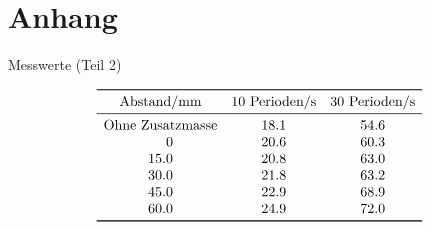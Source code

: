 \documentclass[11pt,a4paper]{article}
\begin{document}

\pagebreak


\section{Anhang}

\begin{table}[h]
\caption{Messwerte (Teil 2)}
$$
\begin{array}{ccc}	
	\toprule 
	\textrm{Abstand/mm} & \textrm{10 Perioden/s} & \textrm{30 Perioden/s}\\
	\midrule
	\multicolumn{1}{l}{\textrm{Ohne Zusatzmasse}} & 18.1 & 54.6\\
	\phantom{zz.}0 & 20.6 & 60.3\\
	15.0 & 20.8 & 63.0\\
	30.0 & 21.8 & 63.2\\
	45.0 & 22.9 & 68.9\\
	60.0 & 24.9 & 72.0\\
	\bottomrule 
\end{array}
$$
\end{table}
\end{document}
